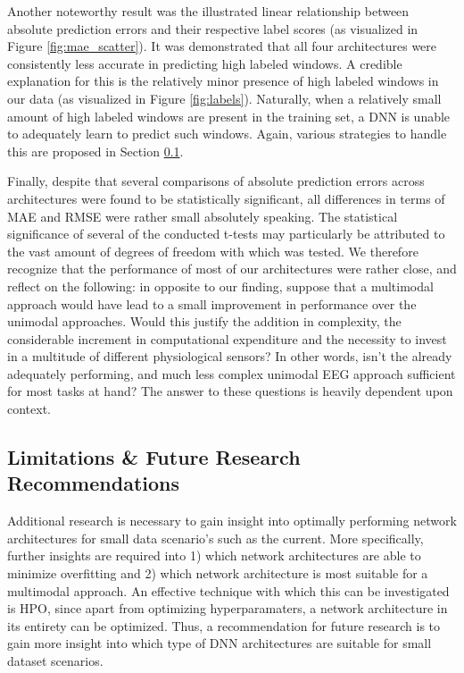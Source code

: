 \documentclass[fleqn,11pt]{paper}
\begin{document}
Another noteworthy result was the illustrated linear relationship between absolute prediction errors and their respective label scores (as visualized in Figure \ref{fig:mae_scatter}). It was demonstrated that all four architectures were consistently less accurate in predicting high labeled windows.  A credible explanation for this is the relatively minor presence of high labeled windows in our data (as visualized in Figure \ref{fig:labels}). Naturally, when a relatively small amount of high labeled windows are present in the training set, a DNN is unable to adequately learn to predict such windows. Again, various strategies to handle this are proposed in Section \ref{sec:future}. 

Finally, despite that several comparisons of absolute prediction errors across architectures were found to be statistically significant, all differences in terms of MAE and RMSE were rather small absolutely speaking. The statistical significance of several of the conducted t-tests may particularly be attributed to the vast amount of degrees of freedom with which was tested. We therefore recognize that the performance of most of our architectures were rather close, and reflect on the following: in opposite to our finding, suppose that a multimodal approach would have lead to a small improvement in performance over the unimodal approaches. Would this justify the addition in complexity,  the considerable increment in computational expenditure and the necessity to invest in a multitude of different physiological sensors? In other words, isn't the already adequately performing, and much less complex unimodal EEG approach sufficient for most tasks at hand? The answer to these questions is heavily dependent upon context.

\subsection{Limitations \& Future Research Recommendations} \label{sec:future}
Additional research is necessary to gain insight into optimally performing network architectures for small data scenario's such as the current.  More specifically,  further insights are required into 1) which network architectures are able to minimize overfitting and 2) which network architecture is most suitable for a multimodal approach. An effective technique with which this can be investigated is HPO, since apart from optimizing hyperparamaters, a network architecture in its entirety can be optimized. Thus, a recommendation for future research is to gain more insight into which type of DNN architectures are suitable for small dataset scenarios.
\end{document}
